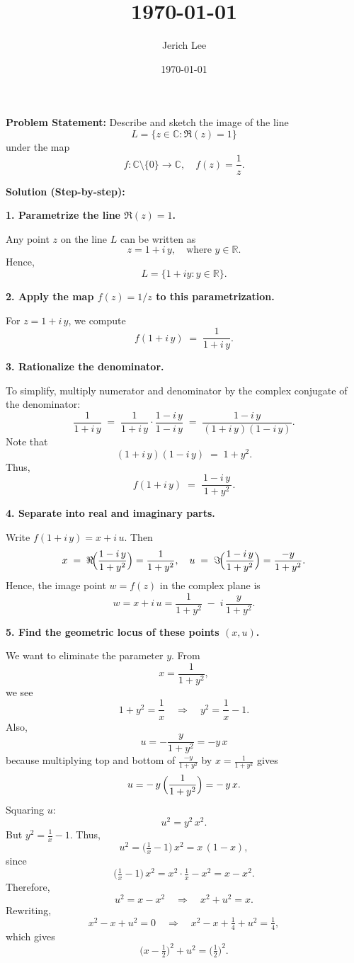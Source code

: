 \documentclass[12pt]{article}
\title{\today}
\author{Jerich Lee}
\date{\today}
\theoremstyle{definition} %
\theoremstyle{plain} %
\begin{document}
\maketitle
\textbf{Problem Statement:} 
Describe and sketch the image of the line 
\[
L = \{z \in \mathbb{C} : \Re(z) = 1\}
\]
under the map 
\[
f: \mathbb{C}\setminus\{0\} \to \mathbb{C}, \quad f(z) = \frac{1}{z}.
\]

\textbf{Solution (Step-by-step):}

\textbf{1. Parametrize the line \(\Re(z) = 1\).}

Any point \(z\) on the line \(L\) can be written as 
\[
z = 1 + i\,y, \quad \text{where } y \in \mathbb{R}.
\]
Hence,
\[
L = \{1 + i y : y \in \mathbb{R}\}.
\]

\textbf{2. Apply the map \(f(z) = 1/z\) to this parametrization.}

For \(z = 1 + i\,y\), we compute
\[
f(1 + i\,y) \;=\; \frac{1}{1 + i\,y}.
\]

\textbf{3. Rationalize the denominator.}

To simplify, multiply numerator and denominator by the complex conjugate of the denominator:
\[
\frac{1}{1 + i\,y} 
\;=\; 
\frac{1}{1 + i\,y} \cdot \frac{1 - i\,y}{1 - i\,y}
\;=\;
\frac{\,1 - i\,y\,}{(1 + i\,y)(1 - i\,y)}.
\]
Note that
\[
(1 + i\,y)(1 - i\,y) \;=\; 1 + y^2.
\]
Thus,
\[
f(1 + i\,y) 
\;=\; 
\frac{\,1 - i\,y\,}{1 + y^2}.
\]

\textbf{4. Separate into real and imaginary parts.}

Write \(f(1 + i\,y) = x + i\,u\). Then
\[
x \;=\; \Re\!\Bigl(\frac{1 - i\,y}{1 + y^2}\Bigr) 
= \frac{1}{1 + y^2},
\quad
u \;=\; \Im\!\Bigl(\frac{1 - i\,y}{1 + y^2}\Bigr)
= \frac{-y}{1 + y^2}.
\]
Hence, the image point \(w = f(z)\) in the complex plane is
\[
w = x + i\,u = \frac{1}{1 + y^2} \;-\; i \,\frac{y}{1 + y^2}.
\]

\textbf{5. Find the geometric locus of these points \((x,u)\).}

We want to eliminate the parameter \(y\). From
\[
x = \frac{1}{1 + y^2},
\]
we see 
\[
1 + y^2 = \frac{1}{x} 
\quad \Longrightarrow \quad
y^2 = \frac{1}{x} - 1.
\]
Also,
\[
u = -\frac{y}{1 + y^2} = -y \, x
\]
because multiplying top and bottom of \(\frac{-y}{1+y^2}\) by \(x = \frac{1}{1+y^2}\) gives
\[
u = -\,y \, \Bigl(\frac{1}{1 + y^2}\Bigr) = -\,y \,x.
\]
Squaring \(u\):
\[
u^2 = y^2 \, x^2.
\]
But \(y^2 = \tfrac{1}{x} - 1\). Thus,
\[
u^2 = \bigl(\tfrac{1}{x} - 1\bigr)\,x^2 = x \,(1 - x),
\]
since
\[
\bigl(\tfrac{1}{x} - 1\bigr)\,x^2 
= x^2 \cdot \tfrac{1}{x} - x^2
= x - x^2.
\]
Therefore,
\[
u^2 = x - x^2 
\quad \Longrightarrow \quad
x^2 + u^2 = x.
\]
Rewriting,
\[
x^2 - x + u^2 = 0 
\quad \Longrightarrow \quad
x^2 - x + \tfrac{1}{4} + u^2 = \tfrac{1}{4},
\]
which gives
\[
\bigl(x - \tfrac{1}{2}\bigr)^2 + u^2 = \bigl(\tfrac{1}{2}\bigr)^2.
\]
\end{document}
